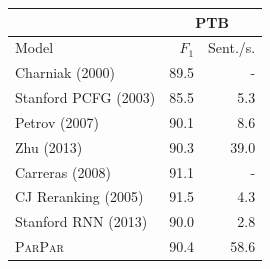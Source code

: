 \documentclass[11pt,letterpaper]{article}
\newcommand{\ParseName}{\textsc{ParPar}}
\begin{document}
\begin{table}
  \centering
  

  \begin{tabular}{|l|rr|}
    \hline
    & \multicolumn{2}{|c|}{PTB} \\
    \hline

    \hline
    Model & $F_1$ & Sent./s.\\
    \hline
    Charniak (2000)     &   89.5 &  -  \\
    Stanford PCFG (2003)     &   85.5 & 5.3  \\
    Petrov (2007)       &   90.1 & 8.6  \\
    Zhu (2013)           &   90.3 & 39.0 \\
    Carreras (2008)      &   91.1 & -    \\
\hline
    CJ Reranking (2005)      &   91.5 & 4.3  \\
    Stanford RNN (2013)       &   90.0 & 2.8  \\ 
\hline
    \ParseName        &   90.4 & 58.6 \\
    \hline
  \end{tabular}



\end{table}
\end{document}
